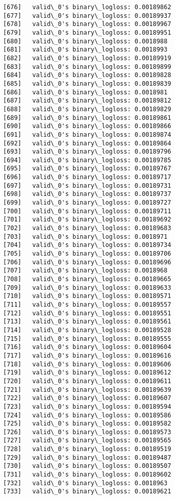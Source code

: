 \documentclass[11pt]{article}
\begin{document}
\begin{Verbatim}[commandchars=\\\{\}]
[676]	valid\_0's binary\_logloss: 0.00189862
[677]	valid\_0's binary\_logloss: 0.00189937
[678]	valid\_0's binary\_logloss: 0.00189967
[679]	valid\_0's binary\_logloss: 0.00189951
[680]	valid\_0's binary\_logloss: 0.0018988
[681]	valid\_0's binary\_logloss: 0.0018993
[682]	valid\_0's binary\_logloss: 0.00189919
[683]	valid\_0's binary\_logloss: 0.00189899
[684]	valid\_0's binary\_logloss: 0.00189828
[685]	valid\_0's binary\_logloss: 0.00189839
[686]	valid\_0's binary\_logloss: 0.0018981
[687]	valid\_0's binary\_logloss: 0.00189812
[688]	valid\_0's binary\_logloss: 0.00189829
[689]	valid\_0's binary\_logloss: 0.00189861
[690]	valid\_0's binary\_logloss: 0.00189866
[691]	valid\_0's binary\_logloss: 0.00189874
[692]	valid\_0's binary\_logloss: 0.00189864
[693]	valid\_0's binary\_logloss: 0.00189796
[694]	valid\_0's binary\_logloss: 0.00189785
[695]	valid\_0's binary\_logloss: 0.00189767
[696]	valid\_0's binary\_logloss: 0.00189717
[697]	valid\_0's binary\_logloss: 0.00189731
[698]	valid\_0's binary\_logloss: 0.00189737
[699]	valid\_0's binary\_logloss: 0.00189727
[700]	valid\_0's binary\_logloss: 0.00189711
[701]	valid\_0's binary\_logloss: 0.00189692
[702]	valid\_0's binary\_logloss: 0.00189683
[703]	valid\_0's binary\_logloss: 0.0018971
[704]	valid\_0's binary\_logloss: 0.00189734
[705]	valid\_0's binary\_logloss: 0.00189706
[706]	valid\_0's binary\_logloss: 0.00189696
[707]	valid\_0's binary\_logloss: 0.0018968
[708]	valid\_0's binary\_logloss: 0.00189665
[709]	valid\_0's binary\_logloss: 0.00189633
[710]	valid\_0's binary\_logloss: 0.00189571
[711]	valid\_0's binary\_logloss: 0.00189557
[712]	valid\_0's binary\_logloss: 0.00189551
[713]	valid\_0's binary\_logloss: 0.00189561
[714]	valid\_0's binary\_logloss: 0.00189528
[715]	valid\_0's binary\_logloss: 0.00189555
[716]	valid\_0's binary\_logloss: 0.00189604
[717]	valid\_0's binary\_logloss: 0.00189616
[718]	valid\_0's binary\_logloss: 0.00189606
[719]	valid\_0's binary\_logloss: 0.00189612
[720]	valid\_0's binary\_logloss: 0.00189611
[721]	valid\_0's binary\_logloss: 0.00189639
[722]	valid\_0's binary\_logloss: 0.00189607
[723]	valid\_0's binary\_logloss: 0.00189594
[724]	valid\_0's binary\_logloss: 0.00189586
[725]	valid\_0's binary\_logloss: 0.00189582
[726]	valid\_0's binary\_logloss: 0.00189573
[727]	valid\_0's binary\_logloss: 0.00189565
[728]	valid\_0's binary\_logloss: 0.00189519
[729]	valid\_0's binary\_logloss: 0.00189487
[730]	valid\_0's binary\_logloss: 0.00189507
[731]	valid\_0's binary\_logloss: 0.00189602
[732]	valid\_0's binary\_logloss: 0.0018963
[733]	valid\_0's binary\_logloss: 0.00189621

\end{Verbatim}
\end{document}
